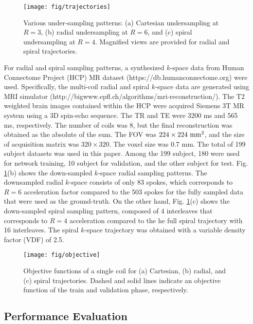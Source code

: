 \documentclass[10pt,journal]{IEEEtran}
\newcommand{\0}{{\boldsymbol{0}}}
\begin{document}
\begin{figure}[!t] 	
\centering
{\texttt{[image: fig/trajectories]}}
\caption{Various under-sampling patterns: (a) Cartesian undersampling at $R=3$, (b) radial undersampling at $R=6$, and (c) spiral undersampling at $R=4$.
Magnified views are provided for radial and spiral trajectories. }
\label{fig:trajectories}
\end{figure}



For radial and spiral sampling patterns, a synthesized $k$-space data from Human Connectome Project (HCP) MR dataset (https://db.humanconnectome.org) were used.
Specifically, the multi-coil radial and spiral $k$-space data are generated using MRI simulator (http://bigwww.epfl.ch/algorithms/mri-reconstruction/).
The T2 weighted brain images contained within the HCP were acquired Siemens 3T MR system using a 3D spin-echo sequence. The TR and TE were 3200 ms and 565 ms, respectively. The number of coils was 8, but the final reconstruction was obtained as the absolute of the sum. 
The FOV was $224 \times 224 ~\rm{mm}^2$, and the size of acquisition matrix was $320 \times 320$. The voxel size was 0.7 mm. 
The total of 199 subject datasets was used in this paper. Among the 199 subject, 180 were used for network training,  10 subject  for validation, and the other subject  for test.
Fig. \ref{fig:trajectories}(b) shows the down-sampled $k$-space radial sampling patterns. 
The  downsampled radial $k$-space consists of only 83 spokes, which corresponds to 
$R=6$ acceleration factor compared to the 503 spokes for the fully sampled data that were used as the ground-truth.
On the other hand,  Fig. \ref{fig:trajectories}(c) shows the down-sampled spiral sampling pattern, composed of
4 interleaves that corresponds to $R=4$ acceleration compared to the
he full spiral trajectory with 16 interleaves. The spiral $k$-space trajectory was obtained with a variable density factor (VDF) of 2.5. 


\begin{figure}[!b] 	
\centerline{\texttt{[image: fig/objective]}}
\caption{Objective functions of a single coil for (a) Cartesian, (b) radial, and (c) spiral trajectories. Dashed and solid lines indicate an objective function of the train and validation phase, respectively.}
\label{fig:objective}
\end{figure}


\subsection{Performance Evaluation}
\end{document}
